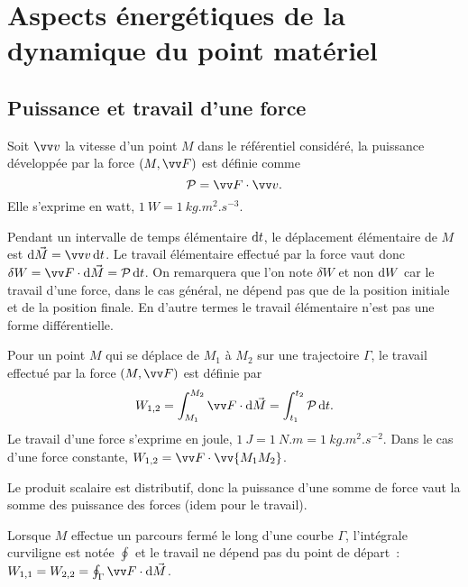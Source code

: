 \chapter{Aspects énergétiques de la dynamique du point matériel}
\label{chap:aspectenergetiques}
\minitoc{}
\minilof{}
\minilot{}

\section{Puissance et travail d'une force}
\label{chap4-sec:puissanceettravail}
\begin{defdef}[Puissance]
  Soit \(\vvv\) la vitesse d'un point \(M\) dans le référentiel considéré, la puissance développée par la force \((M, \vF)\) est définie comme
  \begin{equation}
    \P=\vF \cdot \vvv.
  \end{equation}
  Elle s'exprime en watt, \(\SI{1}{W}=\SI{1}{kg.m^2.s^{-3}}\).
\end{defdef}
 Pendant un intervalle de temps élémentaire \(\mathop{}\mathopen{}\mathrm{d} t\), le déplacement élémentaire de \(M\) est \(\diff \vec{M} = \vvv \diff t\). Le travail élémentaire effectué par la force vaut donc \(\delta W = \vF \cdot \diff \vec{M} = \P \diff t\). On remarquera que l'on note \(\delta W\) et non \(\mathop{}\mathopen{}\mathrm{d} W\) car le travail d'une force, dans le cas général, ne dépend pas que de la position initiale et de la position finale. En d'autre termes le travail élémentaire n'est pas une forme différentielle.
\begin{defdef}[Travail]
  Pour un point \(M\) qui se déplace de \(M_1\) à \(M_2\) sur une trajectoire \(\Gamma\), le travail effectué par la force \((M, \vF)\) est définie par
\begin{equation}
  W_{1, 2} = \int_{M_1}^{M_2} \vF \cdot \diff \vec{M} = \int_{t_1}^{t_2} \P \diff t.
\end{equation}
Le travail d'une force s'exprime en joule, \(\SI{1}{J}=\SI{1}{N.m}=\SI{1}{kg.m^2.s^{-2}}\). Dans le cas d'une force constante, \(W_{1, 2}=\vF \cdot \vv{M_1M_2}\).
\end{defdef}
 Le produit scalaire est distributif, donc la puissance d'une somme de force vaut la somme des puissance des forces (idem pour le travail).

Lorsque \(M\) effectue un parcours fermé le long d'une courbe \(\Gamma\), l'intégrale curviligne est notée \(\oint\) et le travail ne dépend pas du point de départ~: \(W_{1,1} = W_{2,2} = \oint_\Gamma \vF \cdot \diff \vec{M}\).


